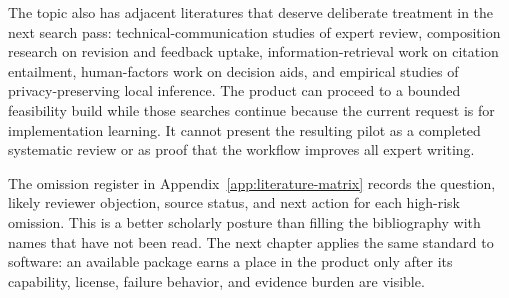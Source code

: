 The topic also has adjacent literatures that deserve deliberate treatment in
the next search pass: technical-communication studies of expert review,
composition research on revision and feedback uptake, information-retrieval
work on citation entailment, human-factors work on decision aids, and empirical
studies of privacy-preserving local inference. The product can proceed to a
bounded feasibility build while those searches continue because the current
request is for implementation learning. It cannot present the resulting
pilot as a completed systematic review or as proof that the workflow improves
all expert writing.

The omission register in Appendix~\ref{app:literature-matrix} records the
question, likely reviewer objection, source status, and next action for each
high-risk omission. This is a better scholarly posture than filling the
bibliography with names that have not been read. The next chapter applies the
same standard to software: an available package earns a place in the product
only after its capability, license, failure behavior, and evidence burden are
visible.
